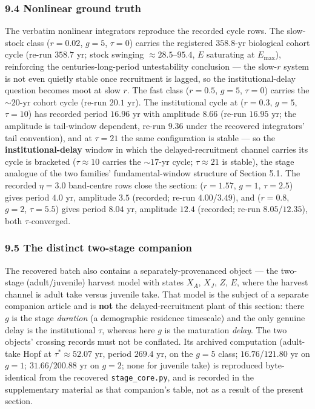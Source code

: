 \documentclass[11pt]{article}
\begin{document}
\subsubsection{9.4 Nonlinear ground truth}\label{nonlinear-ground-truth}

The verbatim nonlinear integrators reproduce the recorded cycle rows.
The slow-stock class (\(r = 0.02\), \(g = 5\), \(\tau = 0\)) carries the
registered \(358.8\)-yr biological cohort cycle (re-run \(358.7\) yr;
stock swinging \(\approx 28.5\)--\(95.4\), \(E\) saturating at
\(E_{\max}\)), reinforcing the centuries-long-period untestability
conclusion --- the slow-\(r\) system is not even quietly stable once
recruitment is lagged, so the institutional-delay question becomes moot
at slow \(r\). The fast class (\(r = 0.5\), \(g = 5\), \(\tau = 0\))
carries the \(\sim 20\)-yr cohort cycle (re-run \(20.1\) yr). The
institutional cycle at (\(r = 0.3\), \(g = 5\), \(\tau = 10\)) has
recorded period \(16.96\) yr with amplitude \(8.66\) (re-run \(16.95\)
yr; the amplitude is tail-window dependent, re-run \(9.36\) under the
recovered integrators' tail convention), and at \(\tau = 21\) the same
configuration is stable --- so the \textbf{institutional-delay} window
in which the delayed-recruitment channel carries its cycle is bracketed
(\(\tau \approx 10\) carries the \(\sim 17\)-yr cycle;
\(\tau \approx 21\) is stable), the stage analogue of the two families'
fundamental-window structure of Section 5.1. The recorded \(\eta = 3.0\)
band-centre rows close the section: (\(r = 1.57\), \(g = 1\),
\(\tau = 2.5\)) gives period \(4.0\) yr, amplitude \(3.5\) (recorded;
re-run \(4.00\)/\(3.49\)), and (\(r = 0.8\), \(g = 2\), \(\tau = 5.5\))
gives period \(8.04\) yr, amplitude \(12.4\) (recorded; re-run
\(8.05\)/\(12.35\)), both \(\tau\)-converged.

\subsubsection{9.5 The distinct two-stage
companion}\label{the-distinct-two-stage-companion}

The recovered batch also contains a separately-provenanced object ---
the two-stage (adult/juvenile) harvest model with states \(X_A\),
\(X_J\), \(Z\), \(E\), where the harvest channel is adult take versus
juvenile take. That model is the subject of a separate companion article
and is \textbf{not} the delayed-recruitment plant of this section: there
\(g\) is the stage \emph{duration} (a demographic residence timescale)
and the only genuine delay is the institutional \(\tau\), whereas here
\(g\) is the maturation \emph{delay}. The two objects' crossing records
must not be conflated. Its archived computation (adult-take Hopf at
\(\tau^* \approx 52.07\) yr, period \(269.4\) yr, on the \(g=5\) class;
\(16.76\)/\(121.80\) yr on \(g=1\); \(31.66\)/\(200.88\) yr on \(g=2\);
none for juvenile take) is reproduced byte-identical from the recovered
\texttt{stage\_core.py}, and is recorded in the supplementary material
as that companion's table, not as a result of the present section.
\end{document}
